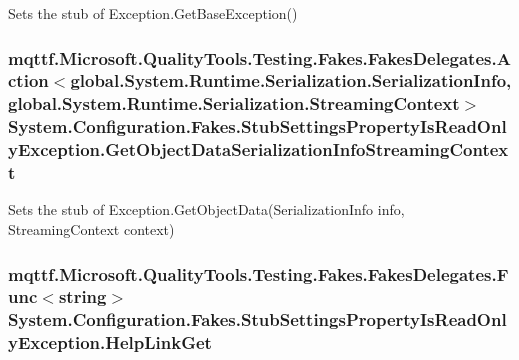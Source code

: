 Sets the stub of Exception.\-Get\-Base\-Exception()

\hypertarget{class_system_1_1_configuration_1_1_fakes_1_1_stub_settings_property_is_read_only_exception_ab38ed3a0a082ba1b25a7d1975d5577bb}{
\subsubsection[{Get\-Object\-Data\-Serialization\-Info\-Streaming\-Context}]{\setlength{\rightskip}{0pt plus 5cm}mqttf.\-Microsoft.\-Quality\-Tools.\-Testing.\-Fakes.\-Fakes\-Delegates.\-Action$<$global.\-System.\-Runtime.\-Serialization.\-Serialization\-Info, global.\-System.\-Runtime.\-Serialization.\-Streaming\-Context$>$ System.\-Configuration.\-Fakes.\-Stub\-Settings\-Property\-Is\-Read\-Only\-Exception.\-Get\-Object\-Data\-Serialization\-Info\-Streaming\-Context}}\label{class_system_1_1_configuration_1_1_fakes_1_1_stub_settings_property_is_read_only_exception_ab38ed3a0a082ba1b25a7d1975d5577bb}


Sets the stub of Exception.\-Get\-Object\-Data(\-Serialization\-Info info, Streaming\-Context context)

\hypertarget{class_system_1_1_configuration_1_1_fakes_1_1_stub_settings_property_is_read_only_exception_a6248d43041b75abae4d568408a125255}{
\subsubsection[{Help\-Link\-Get}]{\setlength{\rightskip}{0pt plus 5cm}mqttf.\-Microsoft.\-Quality\-Tools.\-Testing.\-Fakes.\-Fakes\-Delegates.\-Func$<$string$>$ System.\-Configuration.\-Fakes.\-Stub\-Settings\-Property\-Is\-Read\-Only\-Exception.\-Help\-Link\-Get}}\label{class_system_1_1_configuration_1_1_fakes_1_1_stub_settings_property_is_read_only_exception_a6248d43041b75abae4d568408a125255}


